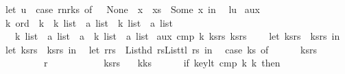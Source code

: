 \begin{isabellebody}
\ \ let\ u\ {\isacharequal}\ case\ rn{\isacharbar}{\isachargreater}r{\isacharunderscore}ks{}\ of\ {\isacharbrackleft}{\isacharbrackright}\ {\isasymRightarrow}\ None\ {\isacharbar}\ x\ {\isacharhash}\ xs\ {\isasymRightarrow}\ Some\ x\ in\isanewline
\ \ {\isacharparenleft}l{\isacharcomma}u{\isacharparenright}{\isacharparenright}{\isachardoublequoteclose}\isanewline
\isanewline
\isanewline
\isanewline
\isanewline
\isanewline
\isanewline
\isanewline
{}\isamarkupfalse%
\ aux{\isacharprime}\ {\isacharcolon}{\isacharcolon}\ \isanewline
\ \ {\isachardoublequoteopen}{\isacharprime}k\ ord\ {\isasymRightarrow}\ {\isacharprime}k\ {\isasymRightarrow}\ {\isacharparenleft}{\isacharprime}k\ list\ {\isacharasterisk}\ {\isacharprime}a\ list{\isacharparenright}\ {\isasymRightarrow}\ {\isacharparenleft}{\isacharprime}k\ list\ {\isacharasterisk}\ {\isacharprime}a\ list{\isacharparenright}\ {\isasymRightarrow}\ \isanewline
\ \ \ \ {\isacharparenleft}{\isacharprime}k\ list\ {\isacharasterisk}\ {\isacharprime}a\ list{\isacharparenright}\ {\isacharasterisk}\ {\isacharprime}a\ {\isacharasterisk}\ {\isacharparenleft}{\isacharprime}k\ list\ {\isacharasterisk}\ {\isacharprime}a\ list{\isacharparenright}{\isachardoublequoteclose}\ \isanewline
{}\isanewline
{\isachardoublequoteopen}aux{\isacharprime}\ cmp\ k{}\ ks{\isacharunderscore}rs{}\ ks{\isacharunderscore}rs{}\ {\isacharequal}\ {\isacharparenleft}\isanewline
\ \ let\ {\isacharparenleft}ks{}{\isacharcomma}rs{}{\isacharparenright}\ {\isacharequal}\ ks{\isacharunderscore}rs{}\ in\isanewline
\ \ let\ {\isacharparenleft}ks{\isacharcomma}rs{\isacharparenright}\ {\isacharequal}\ ks{\isacharunderscore}rs{}\ in\isanewline
\ \ let\ {\isacharparenleft}r{\isacharcomma}rs{\isacharprime}{\isacharparenright}\ {\isacharequal}\ {\isacharparenleft}List{\isachardot}hd\ rs{\isacharcomma}List{\isachardot}tl\ rs{\isacharparenright}\ in\isanewline
\ \ case\ ks\ of\ \isanewline
\ \ {\isacharbrackleft}{\isacharbrackright}\ {\isasymRightarrow}\ {\isacharparenleft}\ {\isacharparenleft}ks{}{\isacharcomma}rs{}{\isacharparenright}{\isacharcomma}\ \isanewline
\ \ \ \ \ \ \ \ \ \ r{\isacharcomma}\ \isanewline
\ \ \ \ \ \ \ \ \ \ {\isacharparenleft}ks{\isacharcomma}rs{\isacharprime}{\isacharparenright}{\isacharparenright}\isanewline
\ \ {\isacharbar}\ k{\isacharhash}ks{\isacharprime}\ {\isasymRightarrow}\ {\isacharparenleft}\isanewline
\ \ \ \ if\ key{\isacharunderscore}lt\ cmp\ k{}\ k\ then\isanewline

\end{isabellebody}

